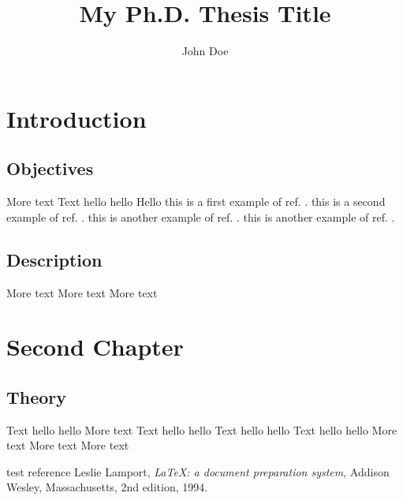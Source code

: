 \documentclass{report}
\title{{\Large\bfseries My Ph.D. Thesis Title}}
\author{John Doe}
\date{}
\begin{document}
 
\maketitle
\tableofcontents

\chapter{Introduction}
\section{Objectives}
More text
Text hello hello
Hello
this is a first example of ref. \cite{Testref98}.
this is a second example of ref. \cite{Testref98,lamport94}.
this is another example of ref. \cite{lamport94}.
this is another example of ref. \cite{lamport94}.

\section{Description}
More text
More text
More text

\chapter{Second Chapter}
\section{Theory}
Text hello hello
More text
Text hello hello
Text hello hello
Text hello hello
More text
More text
More text


\begin{thebibliography}{99}
 test reference
  Leslie Lamport,
  \textit{\LaTeX: a document preparation system},
  Addison Wesley, Massachusetts,
  2nd edition,
  1994.
\end{thebibliography}
\end{document}
